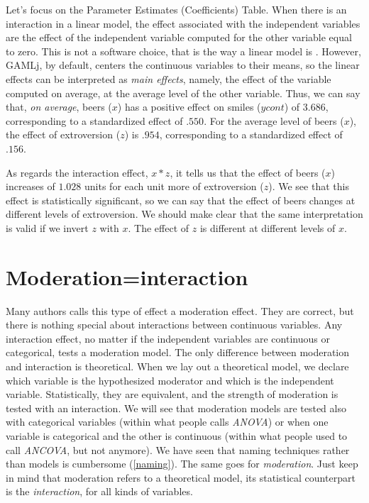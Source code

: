 \documentclass[
]{book}
\begin{document}
Let's focus on the {Parameter Estimates (Coefficients)} Table. When there is an interaction in a linear model, the effect associated with the independent variables are the effect of the independent variable computed for the other variable equal to zero. This is not a software choice, that is the way a linear model is \citep{aiken1991multiple}. However, {GAMLj}, by default, centers the continuous variables to their means, so the linear effects can be interpreted as \emph{main effects}, namely, the effect of the variable computed on average, at the average level of the other variable. Thus, we can say that, \emph{on average}, beers (\(x\)) has a positive effect on smiles (\(ycont\)) of \(3.686\), corresponding to a standardized effect of \(.550\). For the average level of beers (\(x\)), the effect of extroversion (\(z\)) is \(.954\), corresponding to a standardized effect of \(.156\).

As regards the interaction effect, \(x*z\), it tells us that the effect of beers (\(x\)) increases of \(1.028\) units for each unit more of extroversion (\(z\)). We see that this effect is statistically significant, so we can say that the effect of beers changes at different levels of extroversion. We should make clear that the same interpretation is valid if we invert \(z\) with \(x\). The effect of \(z\) is different at different levels of \(x\).

\hypertarget{modint}{%
\section{Moderation=interaction}\label{modint}}

Many authors calls this type of effect a moderation effect. They are correct, but there is nothing special about interactions between continuous variables. Any interaction effect, no matter if the independent variables are continuous or categorical, tests a moderation model. The only difference between moderation and interaction is theoretical. When we lay out a theoretical model, we declare which variable is the hypothesized moderator and which is the independent variable. Statistically, they are equivalent, and the strength of moderation is tested with an interaction. We will see that moderation models are tested also with categorical variables (within what people calls \emph{ANOVA}) or when one variable is categorical and the other is continuous (within what people used to call \emph{ANCOVA}, but not anymore). We have seen that naming techniques rather than models is cumbersome (\ref{naming}). The same goes for \emph{moderation}. Just keep in mind that moderation refers to a theoretical model, its statistical counterpart is the \emph{interaction}, for all kinds of variables.
\end{document}
